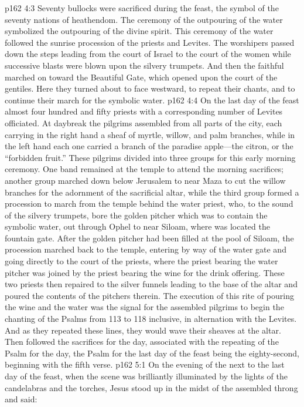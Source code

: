 \vs p162 4:3 Seventy bullocks were sacrificed during the feast, the symbol of the seventy nations of heathendom. The ceremony of the outpouring of the water symbolized the outpouring of the divine spirit. This ceremony of the water followed the sunrise procession of the priests and Levites. The worshipers passed down the steps leading from the court of Israel to the court of the women while successive blasts were blown upon the silvery trumpets. And then the faithful marched on toward the Beautiful Gate, which opened upon the court of the gentiles. Here they turned about to face westward, to repeat their chants, and to continue their march for the symbolic water.
\pc \vs p162 4:4 On the last day of the feast almost four hundred and fifty priests with a corresponding number of Levites officiated. At daybreak the pilgrims assembled from all parts of the city, each carrying in the right hand a sheaf of myrtle, willow, and palm branches, while in the left hand each one carried a branch of the paradise apple---the citron, or the “forbidden fruit.” These pilgrims divided into three groups for this early morning ceremony. One band remained at the temple to attend the morning sacrifices; another group marched down below Jerusalem to near Maza to cut the willow branches for the adornment of the sacrificial altar, while the third group formed a procession to march from the temple behind the water priest, who, to the sound of the silvery trumpets, bore the golden pitcher which was to contain the symbolic water, out through Ophel to near Siloam, where was located the fountain gate. After the golden pitcher had been filled at the pool of Siloam, the procession marched back to the temple, entering by way of the water gate and going directly to the court of the priests, where the priest bearing the water pitcher was joined by the priest bearing the wine for the drink offering. These two priests then repaired to the silver funnels leading to the base of the altar and poured the contents of the pitchers therein. The execution of this rite of pouring the wine and the water was the signal for the assembled pilgrims to begin the chanting of the Psalms from 113 to 118 inclusive, in alternation with the Levites. And as they repeated these lines, they would wave their sheaves at the altar. Then followed the sacrifices for the day, associated with the repeating of the Psalm for the day, the Psalm for the last day of the feast being the eighty\hyp{}second, beginning with the fifth verse.\plusone
{}
\vs p162 5:1 On the evening of the next to the last day of the feast, when the scene was brilliantly illuminated by the lights of the candelabras and the torches, Jesus stood up in the midst of the assembled throng and said:
